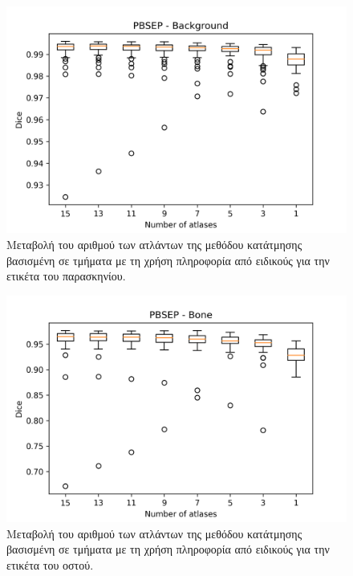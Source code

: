 \documentclass[a4paper,12pt]{article}
\begin{document}
\begin{figure}[H]
    \centering
    \includegraphics[width=0.85\linewidth]{PBSEP_Number_of_atlases_Background_plot.png}
    \caption{Μεταβολή του αριθμού των ατλάντων της μεθόδου κατάτμησης βασισμένη
             σε τμήματα με τη χρήση πληροφορία από ειδικούς για την ετικέτα του
             παρασκηνίου.}
    \label{fig:PBSEP:atlases:1}
\end{figure}

\begin{figure}[H]
    \centering
    \includegraphics[width=0.85\linewidth]{PBSEP_Number_of_atlases_Bone_plot.png}
    \caption{Μεταβολή του αριθμού των ατλάντων της μεθόδου κατάτμησης βασισμένη
             σε τμήματα με τη χρήση πληροφορία από ειδικούς για την ετικέτα του
             οστού.}
    \label{fig:PBSEP:atlases:2}
\end{figure}
\end{document}
